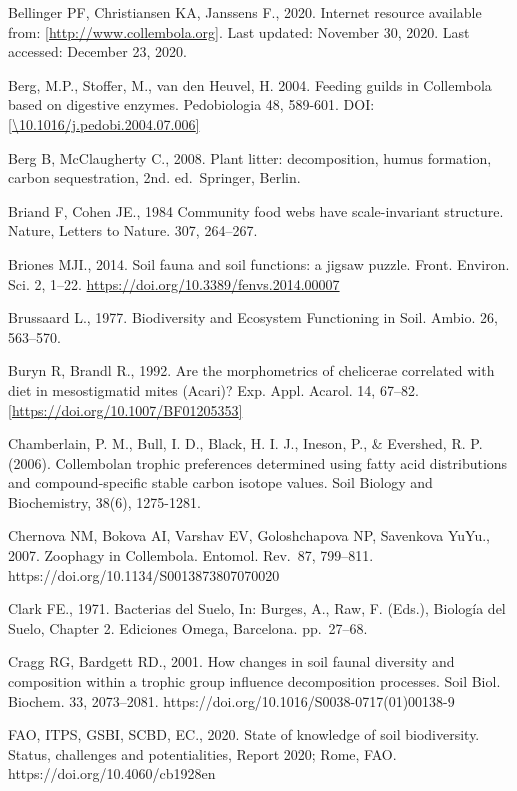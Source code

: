 \documentclass[11pt]{article}
\begin{document}
Bellinger PF, Christiansen KA, Janssens F., 2020. Internet resource
available from:
\href{http://www.collembola.org/}{{[}http://www.collembola.org{]}}. Last
updated: November 30, 2020. Last accessed: December 23, 2020.

Berg, M.P., Stoffer, M., van den Heuvel, H. 2004. Feeding guilds in
Collembola based on digestive enzymes. Pedobiologia 48, 589-601. DOI:
\href{http://dx.doi.org/10.1016\%2Fj.pedobi.2004.07.006}{{[}\textbackslash10.1016/j.pedobi.2004.07.006{]}}

Berg B, McClaugherty C., 2008. Plant litter: decomposition, humus
formation, carbon sequestration, 2nd. ed.~Springer, Berlin.

Briand F, Cohen JE., 1984 Community food webs have scale-invariant
structure. Nature, Letters to Nature. 307, 264--267.

Briones MJI., 2014. Soil fauna and soil functions: a jigsaw puzzle.
Front. Environ. Sci. 2, 1--22.
\url{https://doi.org/10.3389/fenvs.2014.00007}

Brussaard L., 1977. Biodiversity and Ecosystem Functioning in Soil.
Ambio. 26, 563--570.

Buryn R, Brandl R., 1992. Are the morphometrics of chelicerae correlated
with diet in mesostigmatid mites (Acari)? Exp. Appl. Acarol. 14, 67--82.
\href{https://doi.org/10.1007/BF01205353}{{[}https://doi.org/10.1007/BF01205353{]}}

Chamberlain, P. M., Bull, I. D., Black, H. I. J., Ineson, P., \&
Evershed, R. P. (2006). Collembolan trophic preferences determined using
fatty acid distributions and compound-specific stable carbon isotope
values. Soil Biology and Biochemistry, 38(6), 1275-1281.

Chernova NM, Bokova AI, Varshav EV, Goloshchapova NP, Savenkova YuYu.,
2007. Zoophagy in Collembola. Entomol. Rev.~87, 799--811.
https://doi.org/10.1134/S0013873807070020

Clark FE., 1971. Bacterias del Suelo, In: Burges, A., Raw, F. (Eds.),
Biología del Suelo, Chapter 2. Ediciones Omega, Barcelona. pp.~27--68.

Cragg RG, Bardgett RD., 2001. How changes in soil faunal diversity and
composition within a trophic group influence decomposition processes.
Soil Biol. Biochem. 33, 2073--2081.
https://doi.org/10.1016/S0038-0717(01)00138-9

FAO, ITPS, GSBI, SCBD, EC., 2020. State of knowledge of soil
biodiversity. Status, challenges and potentialities, Report 2020; Rome,
FAO. https://doi.org/10.4060/cb1928en
\end{document}
